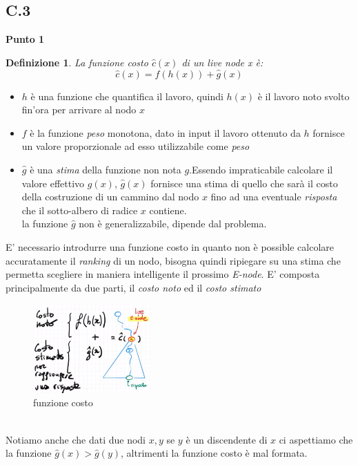 \documentclass[a4paper]{article}
\newtheorem*{definition}{Definizione}
\begin{document}
\subsection{C.3}
\label{SEC:C3}
\textbf{Punto 1}
\begin{adjustwidth}{.8cm}{0cm}
\begin{definition}
	La \textit{funzione costo} $\hat c(x)$ di un \textit{live node x} è: $$\hat c(x) = f(h(x)) + \hat g(x)$$
\end{definition}
\begin{itemize}
	\item$h$ è una funzione che quantifica il lavoro, quindi $h(x)$ è il lavoro noto svolto fin'ora per arrivare al nodo $x$
	\item$f$ è la funzione \emph{peso} monotona, dato in input il lavoro ottenuto da $h$ fornisce un valore proporzionale ad esso utilizzabile come \emph{peso}
	\item$\hat g$ è una \textit{stima} della funzione non nota $g$.Essendo impraticabile calcolare il valore effettivo $g(x)$, $\hat g(x)$ fornisce una stima di quello che sarà il costo della costruzione di un cammino dal nodo $x$ fino ad una eventuale \textit{risposta} che il sotto-albero di radice $x$ contiene.\\
		la funzione $\hat g$ non è generalizzabile, dipende dal problema.
\end{itemize}
E' necessario introdurre una funzione costo in quanto non è possible calcolare accuratamente il \textit{ranking} di un nodo, bisogna quindi ripiegare su una stima che permetta scegliere in maniera intelligente il prossimo \textit{E-node}.
E' composta principalmente da due parti, il \textit{costo noto} ed il \textit{costo stimato}\\
\begin{figure}[!ht]
\centering
\includegraphics[width=0.4\textwidth]{./img/C_3_punto1.png}
\caption{funzione costo} \label{FIG:C_3_punto1}
\end{figure}\\
Notiamo anche che dati due nodi $x,y$ se $y$ è un discendente di $x$ ci aspettiamo che la funzione $\hat g(x) > \hat g(y)$, altrimenti la funzione costo è mal formata.
\end{adjustwidth}
\end{document}
